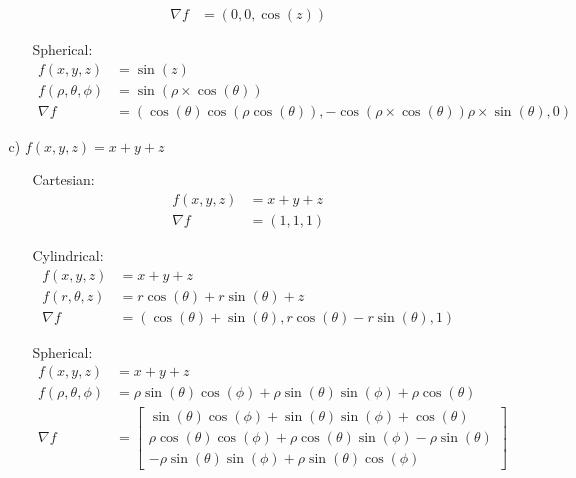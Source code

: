 \documentclass{article}
\begin{document}
\begin{itemize}
\begin{itemize}
\begin{itemize}
\begin{align*}
                \nabla f&=\left(0,0,\cos(z)\right)
            \end{align*}
            \item [Spherical:]
            \begin{align*}
                f(x,y,z)&=\sin(z)\\
                f(\rho,\theta,\phi)&=\sin(\rho\times \cos(\theta))\\
                \nabla f&=\left(\cos(\theta)\cos(\rho\cos(\theta)),-\cos(\rho\times \cos(\theta))\rho\times \sin(\theta),0\right)
            \end{align*}
        \end{itemize}
        \item [c)] \(f(x,y,z)=x+y+z\)
        \begin{itemize}
            \item [Cartesian:] 
            \begin{align*}
                f(x,y,z)&=x+y+z\\
                \nabla f &=(1,1,1)
            \end{align*}
            \item [Cylindrical:]
            \begin{align*}
                f(x,y,z)&=x+y+z\\
                f(r,\theta,z)&=r\cos(\theta)+r\sin(\theta)+z\\
                \nabla f &=\left(\cos(\theta)+\sin(\theta),r\cos(\theta)-r\sin(\theta),1\right)
            \end{align*}
            \item [Spherical:]
            \begin{align*}
                f(x,y,z)&=x+y+z\\
                f(\rho,\theta,\phi) &=\rho\sin(\theta)\cos(\phi)+\rho\sin(\theta)\sin(\phi)+\rho\cos(\theta)\\
                \nabla f &=\begin{bmatrix}
                    \sin(\theta)\cos(\phi)+\sin(\theta)\sin(\phi)+\cos(\theta)\\
                    \rho\cos(\theta)\cos(\phi)+\rho\cos(\theta)\sin(\phi)-\rho\sin(\theta)\\
                    -\rho\sin(\theta)\sin(\phi)+\rho\sin(\theta)\cos(\phi)
                \end{bmatrix}
            \end{align*}
        \end{itemize}

\end{itemize}
\end{itemize}
\end{document}
